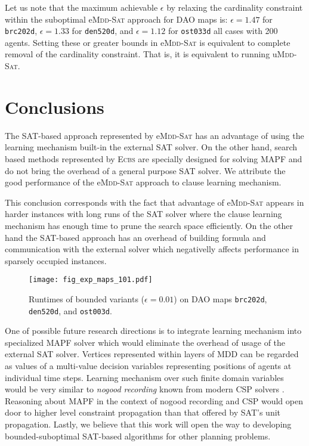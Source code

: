\documentclass[letterpaper]{article}
\begin{document}
Let us note that the maximum achievable $\epsilon$ by relaxing the cardinality constraint within the suboptimal e\textsc{Mdd-Sat} approach for DAO maps is: $\epsilon=1.47$ for \texttt{brc202d}, $\epsilon=1.33$ for \texttt{den520d}, and $\epsilon=1.12$ for \texttt{ost033d} all cases with 200 agents. Setting these or greater bounds in e\textsc{Mdd-Sat} is equivalent to complete removal of the cardinality constraint. That is, it is equivalent to running u\textsc{Mdd-Sat}.

\section{Conclusions}
The SAT-based approach represented by e\textsc{Mdd-Sat} has an advantage of using the learning mechanism built-in the external SAT solver. On the other hand, search based methods represented by \textsc{Ecbs} are specially designed for solving MAPF and do not bring the overhead of a general purpose SAT solver. We attribute the good performance of the e\textsc{Mdd-Sat} approach to clause learning mechanism. 

This conclusion corresponds with the fact that advantage of e\textsc{Mdd-Sat} appears in harder instances with long runs of the SAT solver where the clause learning mechanism has enough time to prune the search space efficiently. On the other hand the SAT-based approach has an overhead of building formula and communication with the external solver which negativelly affects performance in sparsely occupied instances.

\begin{figure}[h]
\texttt{[image: fig\_exp\_maps\_101.pdf]}
\caption{Runtimes of bounded variants ($\epsilon=0.01$) on DAO maps \texttt{brc202d}, \texttt{den520d}, and \texttt{ost003d}.}
\label{fig_exp_maps_101}
\end{figure}

One of possible future research directions is to integrate learning mechanism into specialized MAPF solver which would eliminate the overhead of usage of the external SAT solver. Vertices represented within layers of MDD can be regarded as values of a multi-value decision variables representing positions of agents at individual time steps. Learning mechanism over such finite domain variables would be very similar to {\em nogood recording} known from modern CSP solvers \cite{DBLP:books/daglib/0016622}. Reasoning about MAPF in the context of nogood recording and CSP would open door to higher level constraint propagation than that offered by SAT's unit propagation. 
Lastly, we believe that this work will open the way to developing bounded-suboptimal SAT-based algorithms for other planning problems. 
\end{document}
